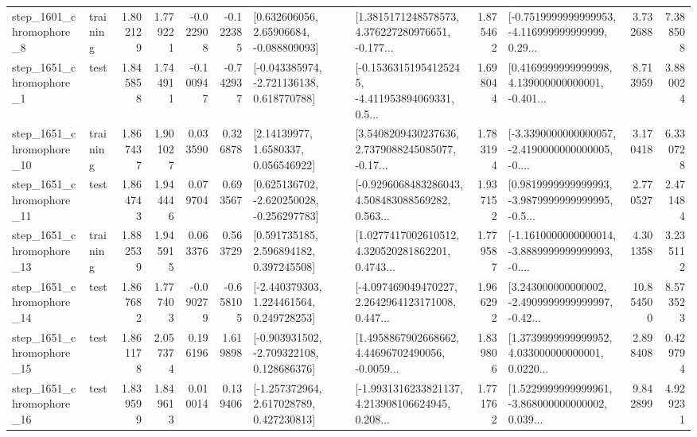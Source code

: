 \begin{tabular}{llrrrrllrlrr}
  step\_1601\_chromophore\_8 &  training &      1.802129 &    1.779221 &     -0.022908 & -0.122385 &     [0.632606056, 2.65906684, -0.088809093] &  [1.3815171248578573, 4.376227280976651, -0.177... &       1.875462 &  [-0.7519999999999953, -4.116999999999999, 0.29... &            3.732688 &          7.388508 \\
  step\_1651\_chromophore\_1 &      test &      1.845858 &    1.744911 &     -0.100947 & -0.742937 &   [-0.043385974, -2.721136138, 0.618770788] &  [-0.15363151954125245, -4.411953894069331, 0.5... &       1.698044 &  [0.4169999999999998, 4.139000000000001, -0.401... &            8.713959 &          3.880024 \\
 step\_1651\_chromophore\_10 &  training &      1.867437 &    1.901027 &      0.033590 &  0.326878 &        [2.14139977, 1.6580337, 0.056546922] &  [3.5408209430237636, 2.7379088245085077, -0.17... &       1.783194 &  [-3.3390000000000057, -2.4190000000000005, -0.... &            3.170418 &          6.330728 \\
 step\_1651\_chromophore\_11 &      test &      1.864743 &    1.944446 &      0.079704 &  0.693567 &   [0.625136702, -2.620250028, -0.256297783] &  [-0.9296068483286043, 4.508483088569282, 0.563... &       1.937152 &  [0.9819999999999993, -3.9879999999999995, -0.5... &            2.770527 &          2.471484 \\
 step\_1651\_chromophore\_13 &  training &      1.882539 &    1.945915 &      0.063376 &  0.563729 &     [0.591735185, 2.596894182, 0.397245508] &  [1.0277417002610512, 4.320520281862201, 0.4743... &       1.779587 &  [-1.1610000000000014, -3.8889999999999993, -0.... &            4.301358 &          3.235112 \\
 step\_1651\_chromophore\_14 &      test &      1.867682 &    1.777403 &     -0.090279 & -0.658105 &    [-2.440379303, 1.224461564, 0.249728253] &  [-4.097469049470227, 2.2642964123171008, 0.447... &       1.966292 &  [3.243000000000002, -2.4909999999999997, -0.42... &           10.854500 &          8.573523 \\
 step\_1651\_chromophore\_15 &      test &      1.861178 &    2.057374 &      0.196196 &  1.619898 &   [-0.903931502, -2.709322108, 0.128686376] &  [1.4958867902668662, 4.44696702490056, -0.0059... &       1.839806 &  [1.3739999999999952, 4.033000000000001, 0.0220... &            2.898408 &          0.429794 \\
 step\_1651\_chromophore\_16 &      test &      1.839599 &    1.849613 &      0.010014 &  0.139406 &    [-1.257372964, 2.617028789, 0.427230813] &  [-1.9931316233821137, 4.213908106624945, 0.208... &       1.771762 &  [1.5229999999999961, -3.868000000000002, 0.039... &            9.842899 &          4.929231 \\

\end{tabular}
